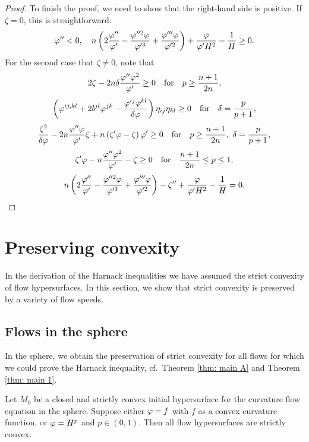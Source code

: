 \documentclass{amsart}
\begin{document}
\begin{proof}
To finish the proof, we need to show that the right-hand side is positive. If $\zeta=0$, this is straightforward:
\[\varphi''<0,\quad n\left(2\frac{\varphi''}{\varphi'}-\frac{\varphi''^{2}\varphi}{\varphi'^{3}}+\frac{\varphi'''\varphi}{\varphi'^{2}}\right)+\frac{\varphi}{\varphi'H^2}-\frac{1}{H}\geq 0.\]
For the second case that $\zeta\neq 0$, note that
$$2\zeta-2n\delta\frac{\varphi''\varphi^2}{\varphi'}\geq 0\quad\mbox{for}\quad p\geq \frac{n+1}{2n},$$
$$\left(\varphi^{ij,kl}+2b^{il}\varphi^{jk}-\frac{\varphi^{ij}\varphi^{kl}}{\delta\varphi}\right)\eta_{ij}\eta_{kl}\geq0\quad\mbox{for}\quad\delta=\frac{p}{p+1},$$
$$\frac{\zeta^2}{\delta\varphi}-2n\frac{\varphi''\varphi}{\varphi'}\zeta+n\left(\zeta'\varphi-\zeta\right)\varphi'\geq 0\quad\mbox{for}\quad p\geq\frac{n+1}{2n},~\delta=\frac{p}{p+1},$$
$$\zeta'\varphi-n\frac{\varphi''\varphi^2}{\varphi'}-\zeta\geq 0\quad\mbox{for}\quad\frac{n+1}{2n}\leq p\leq 1,$$
$$n\left(2\frac{\varphi''}{\varphi'}-\frac{\varphi''^{2}\varphi}{\varphi'^{3}}+\frac{\varphi'''\varphi}{\varphi'^{2}}\right)-\zeta''+\frac{\varphi}{\varphi'H^2}-\frac{1}{H}=0.$$
\end{proof}

\section{Preserving convexity}

In the derivation of the Harnack inequalities we have assumed the strict convexity of flow hypersurfaces. In this section, we show that strict convexity is preserved by a variety of flow speeds.

\subsection{Flows in the sphere}
In the sphere, we obtain the preservation of strict convexity for all flows for which we could prove the Harnack inequality, cf.~Theorem \ref{thm: main A} and Theorem \ref{thm: main 1}.

\begin{proposition}
 Let $M_{0}$ be a closed and strictly convex initial hypersurface for the curvature flow equation
in the sphere. Suppose either $\varphi=f$ with $f$ as a convex curvature function, or  $\varphi=H^{p}$ and $p\in (0,1)$.
Then all flow hypersurfaces are strictly convex.
\end{proposition}
\end{document}
